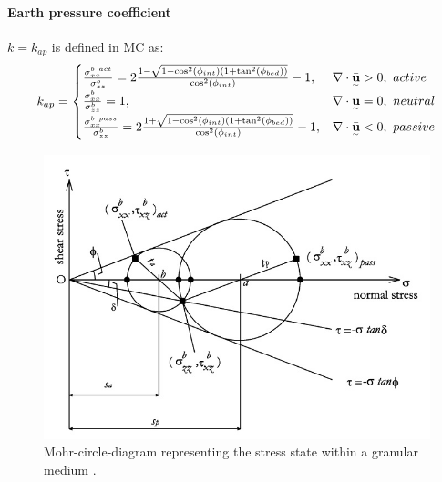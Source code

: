\documentclass{article}
\begin{document}
\paragraph{Earth pressure coefficient} $k=k_{ap}$ is defined in MC as:
\begin{eqnarray}\label{k_ap}
k_{ap} = \begin{cases}
\frac{\sigma_{xx}^{b \ act}}{\sigma_{zz}^b}=2\frac{1-\sqrt{1-\cos^2(\phi_{int})(1+\tan^2 (\phi_{bed}))}}{\cos^2(\phi_{int})}-1, & \nabla \cdot \underset{^\sim}{\bar{\textbf u}}>0, \ active\\
\frac{\sigma_{xx}^{b}}{\sigma_{zz}^b}=1, & \nabla \cdot \underset{^\sim}{\bar{\textbf u}}=0, \ neutral\\
\frac{\sigma_{xx}^{b \ pass}}{\sigma_{zz}^b}=2\frac{1+\sqrt{1-\cos^2(\phi_{int})(1+\tan^2 (\phi_{bed}))}}{\cos^2(\phi_{int})}-1, & \nabla \cdot \underset{^\sim}{\bar{\textbf u}}<0, \ passive
\end{cases}
\end{eqnarray}

\begin{figure}[H]
        \centering
        \includegraphics[width=.7\textwidth]{Figures/mohr.jpg}
        \caption{Mohr-circle-diagram representing the stress state within a granular medium \cite{Pirulli2007}.}
        \label{mohr_circle}
\end{figure}
\end{document}
